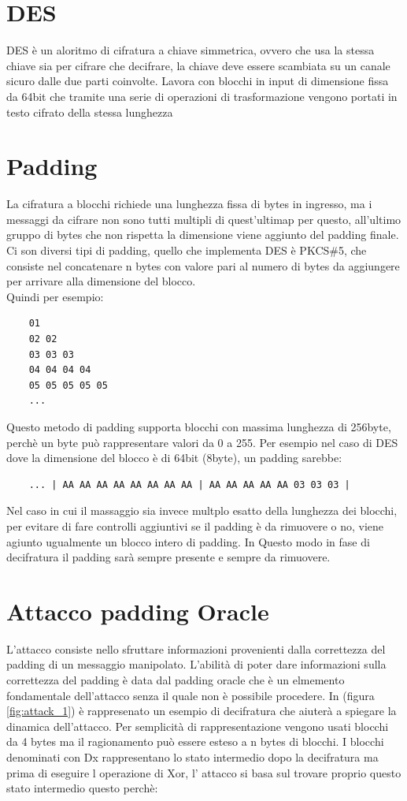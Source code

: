 \section{DES}
DES è un aloritmo di cifratura a chiave simmetrica, ovvero che usa la stessa chiave sia per cifrare che decifrare, 
la chiave deve essere scambiata su un canale sicuro dalle due parti coinvolte.
Lavora con blocchi in input di dimensione fissa da 64bit che tramite una serie di operazioni di trasformazione vengono 
portati in testo cifrato della stessa lunghezza
\section{Padding}
La cifratura a blocchi richiede una lunghezza fissa di bytes in ingresso, ma i messaggi da cifrare 
 non sono tutti multipli di quest'ultimap per questo, all'ultimo gruppo di bytes che non rispetta la dimensione viene aggiunto del padding finale.
Ci son diversi tipi di padding, quello che implementa DES è PKCS\#5, che consiste nel concatenare n bytes con valore pari al numero di bytes da
 aggiungere per arrivare alla dimensione del blocco. 
\\Quindi per esempio:

\begin{verbatim}
    01
    02 02
    03 03 03
    04 04 04 04
    05 05 05 05 05
    ...
\end{verbatim}
Questo metodo di padding supporta blocchi con massima lunghezza di 256byte, perchè un byte può rappresentare valori da 0 a 255.
Per esempio nel caso di DES dove la dimensione del blocco è di 64bit (8byte), un padding sarebbe:

\begin{verbatim}
    ... | AA AA AA AA AA AA AA AA | AA AA AA AA AA 03 03 03 |
\end{verbatim}
Nel caso in cui il massaggio sia invece  multplo esatto della lunghezza dei blocchi, per evitare di fare controlli aggiuntivi se il padding è da rimuovere o no, viene agiunto ugualmente un blocco intero di padding. In Questo modo in fase di decifratura il padding sarà sempre presente e sempre da rimuovere.
\section{Attacco padding Oracle}

L'attacco consiste nello sfruttare informazioni provenienti dalla correttezza del padding di un messaggio manipolato.
L'abilità di poter dare informazioni sulla correttezza del padding è data dal padding oracle che è un elmemento 
fondamentale dell'attacco senza il quale non è possibile procedere.
In (figura \ref{fig:attack_1}) è rappresenato un esempio di decifratura che aiuterà a spiegare la dinamica dell'attacco.
Per semplicità di rappresentazione vengono usati blocchi da 4 bytes ma il ragionamento può essere esteso a n bytes di blocchi.
I blocchi denominati con Dx rappresentano lo stato intermedio dopo la decifratura ma prima di eseguire l operazione di Xor, 
l' attacco si basa sul trovare proprio questo stato intermedio questo perchè:

